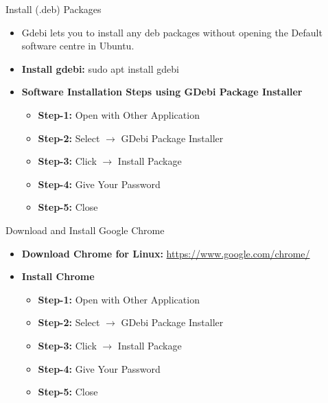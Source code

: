 \begin{frame}[t]{Install (.deb) Packages}
	\begin{itemize}
		\item Gdebi lets you to install any deb packages without opening the 
		Default software centre in Ubuntu.
		\item \textbf{Install gdebi:} sudo apt install gdebi
		\item \textbf{Software Installation Steps using GDebi  Package 
		Installer}
		\begin{itemize}
			\item \textbf{Step-1:}  Open with Other Application 
			\item \textbf{Step-2:}  Select $\rightarrow$ GDebi Package Installer
			\item \textbf{Step-3:}  Click $\rightarrow$ Install Package 
			\item \textbf{Step-4:}  Give Your Password 
			\item \textbf{Step-5:}  Close 
		\end{itemize}
	\end{itemize}
\end{frame}

\begin{frame}[t]{Download and Install Google Chrome}
	\begin{itemize}
		\item \textbf{Download Chrome for Linux:} 
		\url{https://www.google.com/chrome/}
		\item \textbf{Install Chrome} 
			\begin{itemize}
			\item \textbf{Step-1:}  Open with Other Application 
			\item \textbf{Step-2:}  Select $\rightarrow$ GDebi Package Installer
			\item \textbf{Step-3:}  Click $\rightarrow$ Install Package 
			\item \textbf{Step-4:}  Give Your Password 
			\item \textbf{Step-5:}  Close 
		\end{itemize}
	\end{itemize}
\end{frame}

